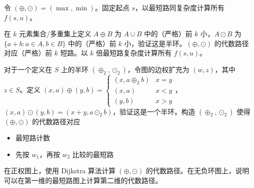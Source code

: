 \begin{exercise}[最大瓶颈路]
    令 $(\oplus,\odot)=(\max,\min)$。固定起点 $s$，以最短路同复杂度计算所有 $f(s,u)$。
\end{exercise}
\begin{exercise}[（严格）前 $k$ 短路]
    在 $k$ 元素集合/多重集上定义 $A\oplus B$ 为 $A\cup B$ 中的（严格）前 $k$ 小，$A\odot B$ 为 $\{a+b:a\in A,b\in B\}$ 中的（严格）前 $k$ 小，验证这是半环。$(\oplus,\odot)$ 的代数路径对应（严格）前 $k$ 短路。以 $k$ 倍最短路复杂度计算所有 $f(s,u)$。
\end{exercise}
\begin{remark}
\end{remark}



\begin{example}
    对于一个定义在 $S$ 上的半环 $(\oplus_2,\odot_2)$，令图的边权扩充为 $(w,z)$，其中 $z\in S$。定义 $(x,a)\oplus (y,b)=\begin{cases}(x,a\oplus_2 b) &x=y\\ (x,a)&x<y\\ (y,b)&x>y\end{cases}$，$(x,a)\odot (y,b)=(x+y,a\odot_2 b)$，验证这是一个半环。构造 $(\oplus_2,\odot_2)$ 使得 $(\oplus,\odot)$ 的代数路径对应 
    \begin{itemize}
        \item 最短路计数
        \item 先按 $w_1$，再按 $w_2$ 比较的最短路
    \end{itemize}
    在正权图上，使用 Dijkstra 算法计算 $(\oplus,\odot)$ 的代数路径。在无负环图上，说明可以在第一维的最短路图上计算第二维的代数路径。
\end{example}







